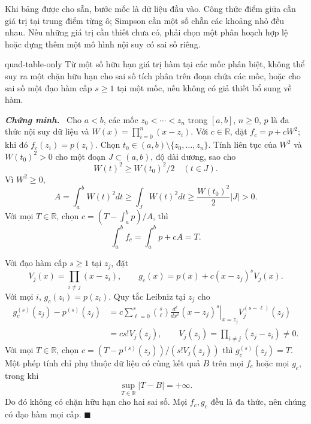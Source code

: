 \documentclass[12pt,a4paper,oneside]{book}
\numberwithin{algorithm}{chapter}
\theoremstyle{definition}
\newenvironment{chungminh}{\par\medskip\noindent\textbf{\textit{\color{mainblue}Chứng minh.}}\ }{\hfill$\blacksquare$\par\medskip}
\newcommand{\R}{\mathbb{R}}
\begin{document}
Khi bảng được cho sẵn, bước mốc là dữ liệu đầu vào. Công thức điểm giữa cần giá trị tại trung điểm từng ô; Simpson cần một số chẵn các khoảng nhỏ đều nhau. Nếu những giá trị cần thiết chưa có, phải chọn một phân hoạch hợp lệ hoặc dựng thêm một mô hình nội suy có sai số riêng.

\begin{menhde}{}{quad-table-only}
Từ một số hữu hạn giá trị hàm tại các mốc phân biệt, không thể suy ra một chặn hữu hạn cho sai số tích phân trên đoạn chứa các mốc, hoặc cho sai số một đạo hàm cấp $s\geq1$ tại một mốc, nếu không có giả thiết bổ sung về hàm.
\end{menhde}
\begin{chungminh}
Cho $a<b$, các mốc $z_0<\cdots<z_n$ trong $[a,b]$, $n\geq0$, $p$ là đa thức nội suy dữ liệu và $W(x)=\prod_{i=0}^n(x-z_i)$. Với $c\in\R$, đặt $f_c=p+cW^2$; khi đó $f_c(z_i)=p(z_i)$. Chọn $t_0\in(a,b)\setminus\{z_0,\ldots,z_n\}$. Tính liên tục của $W^2$ và $W(t_0)^2>0$ cho một đoạn $J\subset(a,b)$, độ dài dương, sao cho
\[
 W(t)^2\geq W(t_0)^2/2\quad(t\in J).
\]
Vì $W^2\geq0$,
\[
 A=\int_a^bW(t)^2dt\geq\int_JW(t)^2dt
 \geq\frac{W(t_0)^2}{2}|J|>0.
\]
Với mọi $T\in\R$, chọn $c=(T-\int_a^bp)/A$, thì
\[
 \int_a^bf_c=\int_a^bp+cA=T.
\]

Với đạo hàm cấp $s\geq1$ tại $z_j$, đặt
\[
 V_j(x)=\prod_{i\ne j}(x-z_i),\qquad
 g_c(x)=p(x)+c(x-z_j)^sV_j(x).
\]
Với mọi $i$, $g_c(z_i)=p(z_i)$. Quy tắc Leibniz tại $z_j$ cho
\begin{align*}
 g_c^{(s)}(z_j)-p^{(s)}(z_j)
 &=c\sum_{\ell=0}^s\binom s\ell
 \left.\frac{d^\ell}{dx^\ell}(x-z_j)^s\right|_{x=z_j}V_j^{(s-\ell)}(z_j)\\
 &=cs!V_j(z_j),\qquad V_j(z_j)=\prod_{i\ne j}(z_j-z_i)\ne0.
\end{align*}
Với mọi $T\in\R$, chọn $c=(T-p^{(s)}(z_j))/(s!V_j(z_j))$ thì $g_c^{(s)}(z_j)=T$. Một phép tính chỉ phụ thuộc dữ liệu có cùng kết quả $B$ trên mọi $f_c$ hoặc mọi $g_c$, trong khi
\[
 \sup_{T\in\R}|T-B|=+\infty.
\]
Do đó không có chặn hữu hạn cho hai sai số. Mọi $f_c,g_c$ đều là đa thức, nên chúng có đạo hàm mọi cấp.
\end{chungminh}
\end{document}
